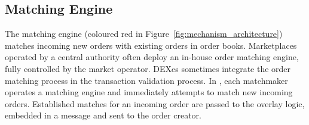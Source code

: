 

\subsection{Matching Engine}
\label{subsec:local_order_book}
The matching engine (coloured red in Figure~\ref{fig:mechanism_architecture}) matches incoming new orders with existing orders in order books.
Marketplaces operated by a central authority often deploy an in-house order matching engine, fully controlled by the market operator.
DEXes sometimes integrate the order matching process in the transaction validation process.
In \ModelName{}, each matchmaker operates a matching engine and immediately attempts to match new incoming orders.
Established matches for an incoming order are passed to the overlay logic, embedded in a \MsgMatch{} message and sent to the order creator.

